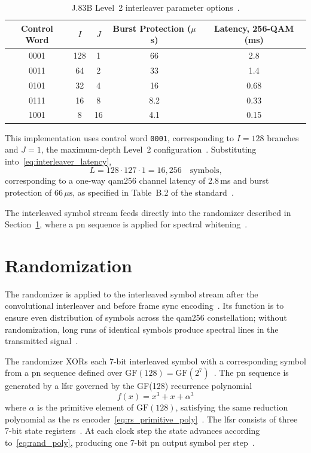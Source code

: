 \begin{table}[htbp]
  \caption{J.83B Level~2 interleaver parameter options~\cite{ITU_J83}.}
  \label{tab:interleaver_modes}
  \centering
  \begin{tabular}{ccccc}
    \hline
    Control Word & $I$ & $J$ &
      Burst Protection ($\mu$s) &
      Latency, 256-QAM (ms) \\
    \hline
    0001 & 128 & 1  & 66  & 2.8  \\
    0011 &  64 & 2  & 33  & 1.4  \\
    0101 &  32 & 4  & 16  & 0.68 \\
    0111 &  16 & 8  & 8.2 & 0.33 \\
    1001 &   8 & 16 & 4.1 & 0.15 \\
    \hline
  \end{tabular}
\end{table}

This implementation uses control word \texttt{0001}, corresponding
to $I = 128$ branches and $J = 1$, the maximum-depth Level~2
configuration~\cite{ITU_J83}.
Substituting into~\eqref{eq:interleaver_latency},
\begin{equation}
  L = 128 \cdot 127 \cdot 1 = 16{,}256 \quad \text{symbols,}
  \label{eq:interleaver_latency_val}
\end{equation}
\noindent corresponding to a one-way \ac{qam256} channel latency
of 2.8\,ms and burst protection of $66\,\mu\mathrm{s}$, as
specified in Table~B.2 of the standard~\cite{ITU_J83}.

The interleaved symbol stream feeds directly into the randomizer
described in Section~\ref{sec:randomization}, where a \ac{pn}
sequence is applied for spectral whitening~\cite{ITU_J83}.


\section{Randomization}
\label{sec:randomization}

The randomizer is applied to the interleaved symbol stream after
the convolutional interleaver and before frame sync
encoding~\cite{ITU_J83}.
Its function is to ensure even distribution of symbols across the
\ac{qam256} constellation; without randomization, long runs of
identical symbols produce spectral lines in the transmitted
signal~\cite{ITU_J83}.

The randomizer XORs each 7-bit interleaved symbol with a
corresponding symbol from a \ac{pn} sequence defined over
$\mathrm{GF}(128) = \mathrm{GF}(2^7)$~\cite{ITU_J83}.
The \ac{pn} sequence is generated by a \ac{lfsr} governed by
the GF(128) recurrence polynomial~\cite{ITU_J83}
\begin{equation}
  f(x) = x^3 + x + \alpha^3
  \label{eq:rand_poly}
\end{equation}
\noindent where $\alpha$ is the primitive element of
$\mathrm{GF}(128)$, satisfying the same reduction polynomial as
the \ac{rs} encoder~\eqref{eq:rs_primitive_poly}~\cite{ITU_J83}.
The \ac{lfsr} consists of three 7-bit state registers~\cite{ITU_J83}.
At each clock step the state advances according to~\eqref{eq:rand_poly},
producing one 7-bit \ac{pn} output symbol per step~\cite{ITU_J83}.

